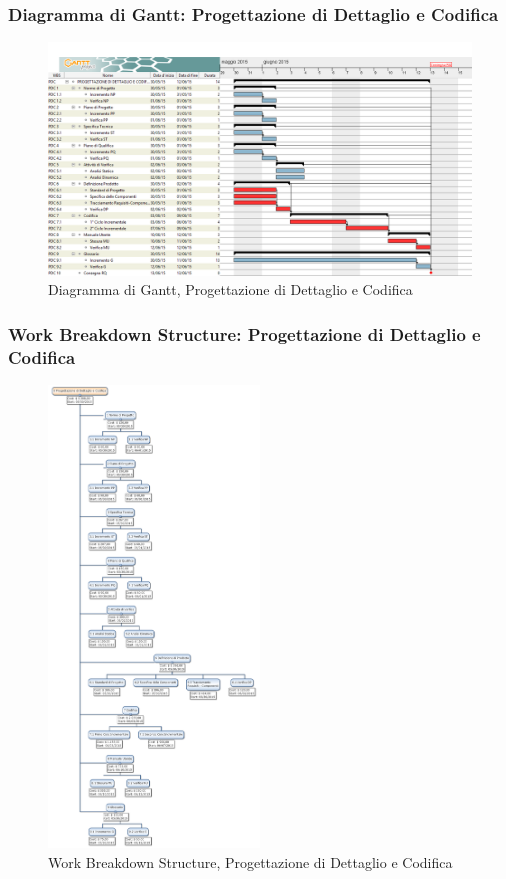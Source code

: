 \subsubsection{Diagramma di Gantt: Progettazione di Dettaglio e Codifica}
\begin{figure}[h] 
	\centering
	\includegraphics[width=\textwidth]{./img/progettazione_dettaglio.png}
	\caption{Diagramma di Gantt, Progettazione di Dettaglio e Codifica}
\end{figure}

\newpage
\subsubsection{Work Breakdown Structure: Progettazione di Dettaglio e Codifica}
\begin{figure}[h]
	\centering
	\includegraphics[width=0.5\textwidth]{./img/wbs_progettazione_dettaglio_codifica.png}
	\caption{Work Breakdown Structure, Progettazione di Dettaglio e Codifica}
\end{figure}

